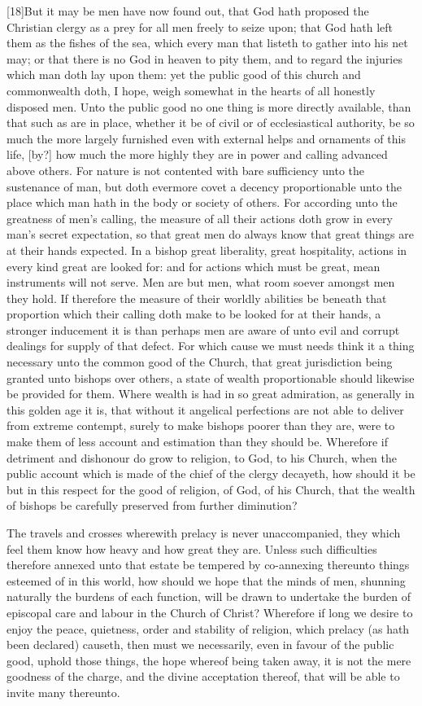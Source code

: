 [18]But it may be men have now found out, that God hath proposed the Christian clergy as a prey for all men freely to seize upon; that God hath left them as the fishes of the sea, which every man that listeth to gather into his net may; or that there is no God in heaven to pity them, and to regard the injuries which man doth lay upon them: yet the public good of this church and commonwealth doth, I hope, weigh somewhat in the hearts of all honestly disposed men. Unto the public good no one thing is more directly available, than that such as are in place, whether it be of civil or of ecclesiastical authority, be so much the more largely furnished even with external helps and ornaments of this life, [by?] how much the more highly they are in power and calling advanced above others. For nature is not contented with bare sufficiency unto the sustenance of man, but doth evermore covet a decency proportionable unto the place which man hath in the body or society of others. For according unto the greatness of men’s calling, the measure of all their actions doth grow in every man’s secret expectation, so that great men do always know that great things are at their hands expected. In a bishop great liberality, great hospitality, actions in every kind great are looked for: and for actions which must be great, mean instruments will not serve. Men are but men, what room soever amongst men they hold. If therefore the measure of their worldly abilities be beneath that proportion which their calling doth make to be looked for at their hands, a stronger inducement it is than perhaps men are aware of unto evil and corrupt dealings for supply of that defect. For which cause we must needs think it a thing necessary unto the  common good of the Church, that great jurisdiction being granted unto bishops over others, a state of wealth proportionable should likewise be provided for them. Where wealth is had in so great admiration, as generally in this golden age it is, that without it angelical perfections are not able to deliver from extreme contempt, surely to make bishops poorer than they are, were to make them of less account and estimation than they should be. Wherefore if detriment and dishonour do grow to religion, to God, to his Church, when the public account which is made of the chief of the clergy decayeth, how should it be but in this respect for the good of religion, of God, of his Church, that the wealth of bishops be carefully preserved from further diminution?

The travels and crosses wherewith prelacy is never unaccompanied, they which feel them know how heavy and how great they are. Unless such difficulties therefore annexed unto that estate be tempered by co-annexing thereunto things esteemed of in this world, how should we hope that the minds of men, shunning naturally the burdens of each function, will be drawn to undertake the burden of episcopal care and labour in the Church of Christ? Wherefore if long we desire to enjoy the peace, quietness, order and stability of religion, which prelacy (as hath been declared) causeth, then must we necessarily, even in favour of the public good, uphold those things, the hope whereof being taken away, it is not the mere goodness of the charge, and the divine acceptation thereof, that will be able to invite many thereunto.

